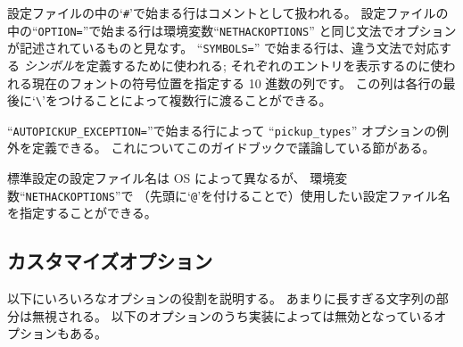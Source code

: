 設定ファイルの中の`{\tt \#}'で始まる行はコメントとして扱われる。
設定ファイルの中の``{\tt OPTION=}''で始まる行は環境変数``{\tt NETHACKOPTIONS}''
と同じ文法でオプションが記述されているものと見なす。
``{\tt SYMBOLS=}'' で始まる行は、違う文法で対応する
{\it シンボル}を定義するために使われる;
それぞれのエントリを表示するのに使われる現在のフォントの符号位置を指定する
10 進数の列です。
この列は各行の最後に`{\tt \verb+\+}'をつけることによって複数行に渡ることができる。

``{\tt AUTOPICKUP\verb+_+EXCEPTION=}''で始まる行によって
``{\tt pickup\verb+_+types}'' オプションの例外を定義できる。
これについてこのガイドブックで議論している節がある。

標準設定の設定ファイル名は OS によって異なるが、
環境変数``{\tt NETHACKOPTIONS}''で
（先頭に`{\tt @}'を付けることで）使用したい設定ファイル名を指定することができる。

\subsection*{カスタマイズオプション}

以下にいろいろなオプションの役割を説明する。
あまりに長すぎる文字列の部分は無視される。
以下のオプションのうち実装によっては無効となっているオプションもある。

